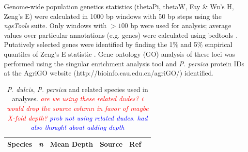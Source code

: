 \documentclass[12pt]{article}
\newcommand{\jri}[1]{\textcolor{red}{\emph{#1}}}
\newcommand{\dv}[1]{\textcolor{blue}{\emph{#1}}}
\begin{document}
Genome-wide population genetics statistics (thetaPi, thetaW, Fay \& Wu's H, Zeng's E) were calculated in 1000 bp windows with 50 bp steps using the \emph{ngsTools} \citep{fumagalli2014ngstools} suite. 
%
Only windows with $>100$ bp were used for analysis; average values over particular annotations (e.g. genes) were calculated using bedtools \citep{quinlan2010bedtools}.
%
Putatively selected genes were identified by finding the 1\% and 5\% empirical quantiles of Zeng's E statistic \citep{zeng2006statistical}.
%
Gene ontology (GO) analysis of these loci was performed using  the singular enrichment analysis tool and \emph{P. persica} protein IDs at the AgriGO website (http://bioinfo.cau.edu.cn/agriGO/) identified.
%
\begin{center}
\begin{longtable}{llllll}
\caption{\emph{P. dulcis}, \emph{P. persica} and related species used in analyses. \jri{are we using these related dudes? i would drop the source column in favor of maybe X-fold depth?} \dv{prob not using related dudes. had also thought about adding depth}} \label{samples} \\
\hline \hline 
\multicolumn{1}{l}{\textbf{Species}} &
\multicolumn{1}{l}{\textbf{\emph{n}}} &
\multicolumn{1}{l}{\textbf{Mean Depth}} &
\multicolumn{1}{l}{\textbf{Source}} &
\multicolumn{1}{l}{\textbf{Ref}}\\
\hline 
\endfirsthead


\end{longtable}
\end{center}
\end{document}
